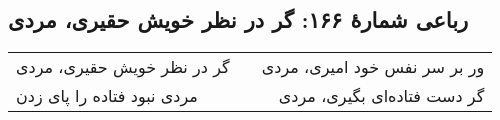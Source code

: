 \begin{center}
\section*{رباعی شمارهٔ ۱۶۶: گر در نظر خویش حقیری، مردی}
\label{sec:166}
\begin{longtable}{l p{0.5cm} r}
گر در نظر خویش حقیری، مردی
&&
ور بر سر نفس خود امیری، مردی
\\
مردی نبود فتاده را پای زدن
&&
گر دست فتاده‌ای بگیری، مردی
\\
\end{longtable}
\end{center}
